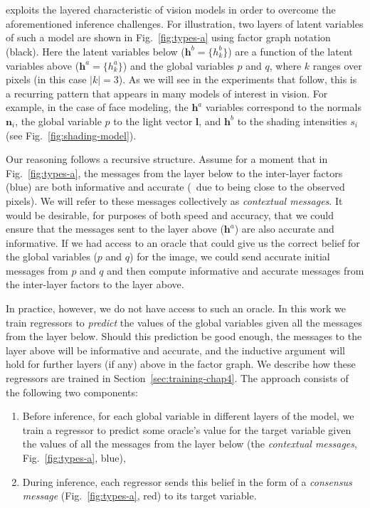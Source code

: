 \section{\METHOD}
\label{sec:method-chap4}

\Method exploits the layered characteristic of vision models in order to overcome the aforementioned inference challenges. For illustration, two layers of latent variables of such a model are shown in Fig.~\ref{fig:types-a} using factor graph notation (black). Here the latent variables below ($\mathbf{h}^b = \{ h^b_k\}$) are a function of the latent variables above ($\mathbf{h}^a = \{ h^a_k\}$) and the global variables $p$ and $q$, where $k$ ranges over pixels (in this case $|k|=3$). As we will see in the experiments that follow, this is a recurring pattern that appears in many models of interest in vision. For example, in the case of face modeling, the $\mathbf{h}^a$ variables correspond to the normals $\mathbf{n}_i$, the global variable $p$ to the light vector $\mathbf{l}$, and $\mathbf{h}^b$ to the shading intensities $s_i$ (see Fig.~\ref{fig:shading-model}).

Our reasoning follows a recursive structure. Assume for a moment that in Fig.~\ref{fig:types-a}, the messages from the layer below to the inter-layer factors (blue) are both informative and accurate (\eg\ due to being close to the observed pixels). We will refer to these messages collectively as \textit{contextual messages}. It would be desirable, for purposes of both speed and accuracy, that we could ensure that the messages sent to the layer above ($\mathbf{h}^a$) are also accurate and informative. If we had access to an oracle that could give us the correct belief for the global variables ($p$ and $q$) for the image, we could send accurate initial messages from $p$ and $q$ and then compute informative and accurate messages from the inter-layer factors to the layer above.

In practice, however, we do not have access to such an oracle. In this work we train regressors to \textit{predict} the values of the global variables given all the messages from the layer below. Should this prediction be good enough, the messages to the layer above will be informative and accurate, and the inductive argument will hold for further layers (if any) above in the factor graph. We describe how these regressors are trained in Section~\ref{sec:training-chap4}. The approach consists of the following two components:

\begin{enumerate}

\item Before inference, for each global variable in different layers of the model, we train a regressor to predict some oracle's value for the target variable given the values of all the messages from the layer below (\ie the \textit{contextual messages}, Fig.~\ref{fig:types-a}, blue),

\item During inference, each regressor sends this belief in the form of a \textit{consensus message} (Fig.~\ref{fig:types-a}, red) to its target variable.

\end{enumerate}

